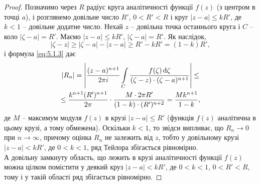 \begin{proof}
	Позначимо через $R$ радіус круга аналітичності функції $f(z)$ (з центром в точці $a$), і розглянемо довільне число $R'$, $0 < R' < R$ і круг $|z - a| \le k R'$, де $k < 1$ -- довільне додатне число. Нехай $z$ -- довільна точка останнього круга і $C$ -- коло $|\zeta - a| = R'$. Маємо $|z - a| \le k R'$, $|\zeta - a| = R'$. Як наслідок,
	\begin{equation*}
		|\zeta - z| \ge |\zeta - a| - |z - a| \ge R' - k R' = (1 - k) R',
	\end{equation*}
	і формула \eqref{eq:5.1.3} %
	дає 
	\begin{multline*}
		|R_n| = \left| \frac{(z - a)^{n + 1}}{2 \pi i} \displaystyle\int\limits_C \frac{f(\zeta) \mathop{}\!\mathrm{d} \zeta}{(\zeta - z) \cdot (\zeta - a)^{n + 1}} \right| \le \\ \le \frac{k^{n + 1}(R')^{n + 1}}{2 \pi} \cdot \frac{M \cdot 2 \pi R'}{(1 - k) \cdot (R')^{n + 2}} = \frac{M k ^{n + 1}}{1 - k},
	\end{multline*}
	де $M$ -- максимум модуля $f(z)$ в крузі $|z - a| \le R'$ (функція $f(z)$ аналітична в цьому крузі, а тому обмежена). Оскільки $k < 1$, то звідси випливає, що $R_n \to 0$ при $n \to \infty$, причому оцінка $R_n$ не залежить від $z$, тобто у довільному крузі $|z - a| < k R'$, де $0 < k < 1$, ряд Тейлора збігається рівномірно. \\

	А довільну замкнуту область, що лежить в крузі аналітичності функції $f(z)$ можна цілком помістити у деякий круз $|z - a| < k R'$, де $0 < k < 1$, $0 < R' < R$, тому і у такій області ряд збігається рівномірно.
\end{proof}

